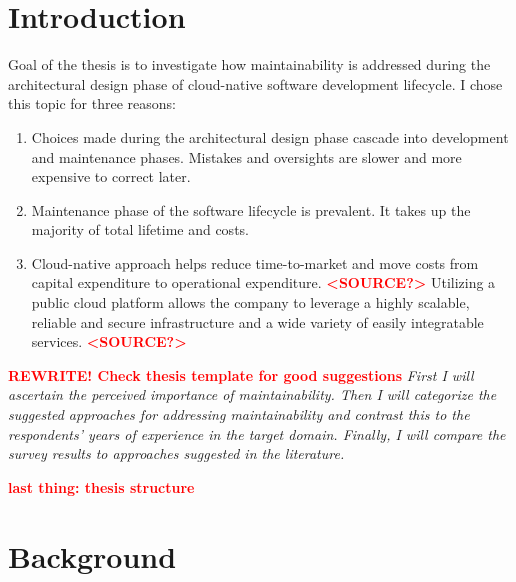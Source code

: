 \documentclass[utf8,english]{gradu3}
\newcommand{\todo}[1]{\textbf{\textcolor{red}{#1}}}
\newcommand{\tmp}[1]{\textit{{#1}}}
\begin{document}
\chapter{Introduction}


Goal of the thesis is to investigate how maintainability is addressed during
the architectural design phase of cloud-native software development lifecycle.
I chose this topic for three reasons:
\begin{enumerate}
  \item Choices made during the architectural design phase cascade into
        development and maintenance phases.
        Mistakes and oversights are slower and more expensive to correct later. \parencite{Bass1998}
  \item Maintenance phase of the software lifecycle is prevalent.
        It takes up the majority of total lifetime and costs. \parencite{Bass1998}
  \item Cloud-native approach helps reduce time-to-market and move costs from
        capital expenditure to operational expenditure. \todo{<SOURCE?>}
        Utilizing a public cloud platform allows the company to leverage a
        highly scalable, reliable and secure infrastructure and a wide variety
        of easily integratable services. \todo{<SOURCE?>}
\end{enumerate}

\todo{REWRITE! Check thesis template for good suggestions}
\tmp{First I will ascertain the perceived importance of maintainability.
Then I will categorize the suggested approaches for addressing maintainability
and contrast this to the respondents' years of experience in the target domain.
Finally, I will compare the survey results to approaches suggested in the literature.}

\todo{last thing: thesis structure}


\chapter{Background}
\end{document}
